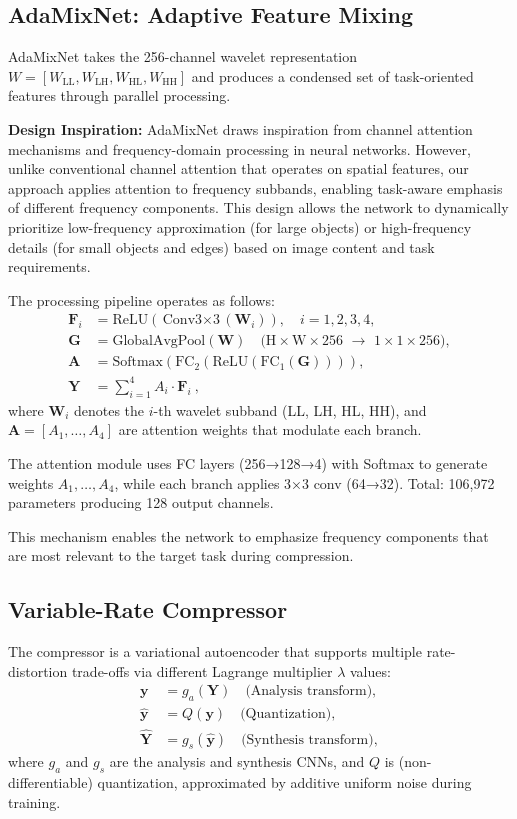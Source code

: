 \documentclass[conference]{IEEEtran}
\begin{document}
\subsection{AdaMixNet: Adaptive Feature Mixing}

AdaMixNet takes the 256-channel wavelet representation $W = [W_{\text{LL}}, W_{\text{LH}}, W_{\text{HL}}, W_{\text{HH}}]$ and produces a condensed set of task-oriented features through parallel processing.

\textbf{Design Inspiration:} AdaMixNet draws inspiration from channel attention mechanisms \cite{hu2018squeeze} and frequency-domain processing in neural networks. However, unlike conventional channel attention that operates on spatial features, our approach applies attention to frequency subbands, enabling task-aware emphasis of different frequency components. This design allows the network to dynamically prioritize low-frequency approximation (for large objects) or high-frequency details (for small objects and edges) based on image content and task requirements.

The processing pipeline operates as follows:
\begin{align}
\mathbf{F}_i &= \text{ReLU}(\text{Conv3$\times$3}(\mathbf{W}_i)), \quad i = 1,2,3,4, \\
\mathbf{G} &= \text{GlobalAvgPool}(\mathbf{W}) \quad \text{(H$\times$W$\times$256 $\to$ 1$\times$1$\times$256)}, \\
\mathbf{A} &= \text{Softmax}(\text{FC}_2(\text{ReLU}(\text{FC}_1(\mathbf{G})))),  \\
\mathbf{Y} &= \sum_{i=1}^{4} A_i \cdot \mathbf{F}_i~,
\end{align}
where $\mathbf{W}_i$ denotes the $i$-th wavelet subband (LL, LH, HL, HH), and $\mathbf{A} = [A_1,\dots,A_4]$ are attention weights that modulate each branch.

The attention module uses FC layers (256→128→4) with Softmax to generate weights $A_1,\dots,A_4$, while each branch applies 3×3 conv (64→32). Total: 106,972 parameters producing 128 output channels.

This mechanism enables the network to emphasize frequency components that are most relevant to the target task during compression. 

\subsection{Variable-Rate Compressor}

The compressor is a variational autoencoder that supports multiple rate-distortion trade-offs via different Lagrange multiplier $\lambda$ values:
\begin{align}
\mathbf{y} &= g_a(\mathbf{Y}) \quad \text{(Analysis transform)}, \\
\hat{\mathbf{y}} &= Q(\mathbf{y}) \quad \text{(Quantization)}, \\
\hat{\mathbf{Y}} &= g_s(\hat{\mathbf{y}}) \quad \text{(Synthesis transform)},
\end{align}
where $g_a$ and $g_s$ are the analysis and synthesis CNNs, and $Q$ is (non-differentiable) quantization, approximated by additive uniform noise during training.
\end{document}
